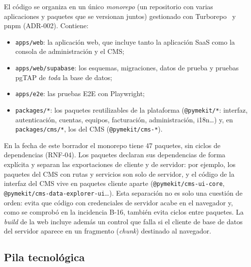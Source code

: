 El código se organiza en un único \textit{monorepo} (un repositorio con
varias aplicaciones y paquetes que se versionan juntos) gestionado con
Turborepo~\cite{turborepo} y pnpm (ADR-002). Contiene:

\begin{itemize}
  \item \texttt{apps/web}: la aplicación web, que incluye tanto la
        aplicación SaaS como la consola de administración y el CMS;
  \item \texttt{apps/web/supabase}: los esquemas, migraciones, datos de
        prueba y pruebas pgTAP de \emph{toda} la base de datos;
  \item \texttt{apps/e2e}: las pruebas E2E con Playwright;
  \item \texttt{packages/*}: los paquetes reutilizables de la plataforma
        (\texttt{@pymekit/*}: interfaz, autenticación, cuentas, equipos,
        facturación, administración, i18n\ldots) y, en
        \texttt{packages/cms/*}, los del CMS (\texttt{@pymekit/cms-*}).
\end{itemize}

En la fecha de este borrador el monorepo tiene 47 paquetes, sin ciclos de
dependencias (RNF-04). Los paquetes declaran sus dependencias de forma
explícita y separan las exportaciones de cliente y de servidor: por ejemplo,
los paquetes del CMS con rutas y servicios son solo de servidor, y el código
de la interfaz del CMS vive en paquetes cliente aparte
(\texttt{@pymekit/cms-ui-core}, \texttt{@pymekit/cms-data-explorer-ui}\ldots).
Esta separación no es solo una cuestión de orden: evita que código con
credenciales de servidor acabe en el navegador y, como se comprobó en la
incidencia B-16, también evita ciclos entre paquetes. La \textit{build} de la
web incluye además un control que falla si el cliente de base de datos del
servidor aparece en un fragmento (\textit{chunk}) destinado al navegador.

\subsection{Pila tecnológica}

